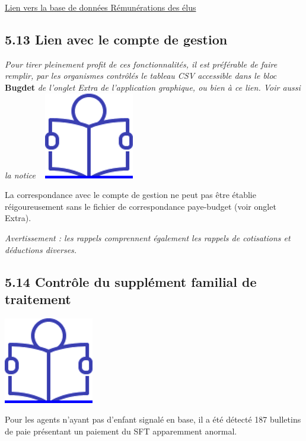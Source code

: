 \href{../Bases/Reglementation/remunerations.elu.csv}{Lien vers la base de
données Rémunérations des élus}

\hypertarget{lien-avec-le-compte-de-gestion}{%
\subsection{5.13 Lien avec le compte de
gestion}\label{lien-avec-le-compte-de-gestion}}

\emph{Pour tirer pleinement profit de ces fonctionnalités, il est
préférable de faire remplir, par les organismes contrôlés le tableau CSV
accessible dans le bloc} \textbf{Bugdet} \emph{de l'onglet Extra de
l'application graphique, ou bien à ce lien. Voir aussi la notice} ~
\href{../Docs/Notices/fiche_tableau_budget.odt}{\includegraphics{icones/Notice.png}}

La correspondance avec le compte de gestion ne peut pas être établie
réigoureusement sans le fichier de correspondance paye-budget (voir
onglet Extra).

\emph{Avertissement : les rappels comprennent également les rappels de
cotisations et déductions diverses.}

\hypertarget{controle-du-supplement-familial-de-traitement}{%
\subsection{5.14 Contrôle du supplément familial de
traitement}\label{controle-du-supplement-familial-de-traitement}}

\href{../Docs/Notices/fiche_SFT.odt}{\includegraphics{icones/Notice.png}}

Pour les agents n'ayant pas d'enfant signalé en base, il a été détecté
187 bulletins de paie présentant un paiement du SFT apparemment anormal.

